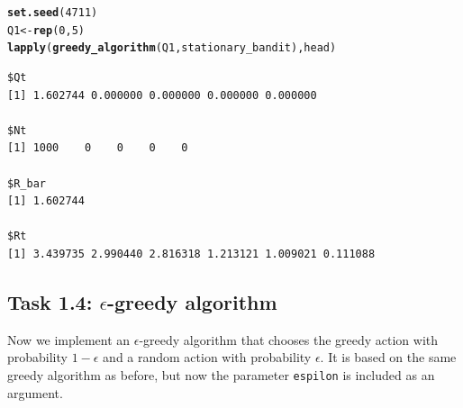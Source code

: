 \documentclass[10pt, a4paper, english]{article}\usepackage[]{graphicx}\usepackage[dvipsnames]{xcolor}
\makeatletter
\newcommand{\hlnum}[1]{\textcolor[rgb]{0.686,0.059,0.569}{#1}}%
\newcommand{\hlstd}[1]{\textcolor[rgb]{0.345,0.345,0.345}{#1}}%
\newcommand{\hlkwb}[1]{\textcolor[rgb]{0.69,0.353,0.396}{#1}}%
\newcommand{\hlkwd}[1]{\textcolor[rgb]{0.737,0.353,0.396}{\textbf{#1}}}%
\newenvironment{kframe}{%
 \def\at@end@of@kframe{}%
 \ifinner\ifhmode%
  \def\at@end@of@kframe{\end{minipage}}%
  \begin{minipage}{\columnwidth}%
 \fi\fi%
 \def\FrameCommand##1{\hskip\@totalleftmargin \hskip-\fboxsep
 \colorbox{shadecolor}{##1}\hskip-\fboxsep
     \hskip-\linewidth \hskip-\@totalleftmargin \hskip\columnwidth}%
 \MakeFramed {\advance\hsize-\width
   \@totalleftmargin\z@ \linewidth\hsize
   \@setminipage}}%
 {\par\unskip\endMakeFramed%
 \at@end@of@kframe}
\newenvironment{knitrout}{}{} %
\makeatother
\begin{document}
\begin{knitrout}
\color{fgcolor}\begin{kframe}
\begin{alltt}
\hlkwd{set.seed}\hlstd{(}\hlnum{4711}\hlstd{)}
\hlstd{Q1} \hlkwb{<-} \hlkwd{rep}\hlstd{(}\hlnum{0}\hlstd{,} \hlnum{5}\hlstd{)}
\hlkwd{lapply}\hlstd{(}\hlkwd{greedy_algorithm}\hlstd{(Q1, stationary_bandit), head)}
\end{alltt}
\begin{verbatim}
$Qt
[1] 1.602744 0.000000 0.000000 0.000000 0.000000

$Nt
[1] 1000    0    0    0    0

$R_bar
[1] 1.602744

$Rt
[1] 3.439735 2.990440 2.816318 1.213121 1.009021 0.111088
\end{verbatim}
\end{kframe}
\end{knitrout}

\subsection{Task 1.4: $\epsilon$-greedy algorithm}
Now we implement an $\epsilon$-greedy algorithm that chooses the greedy action with probability $1-\epsilon$ and a random action with probability $\epsilon$. It is based on the same greedy algorithm as before, but now  the parameter \texttt{espilon} is included as an argument. 
\end{document}
